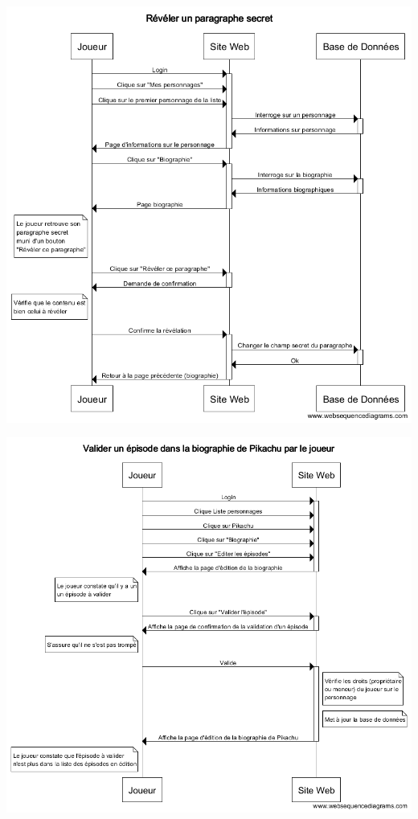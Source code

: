 \documentclass[a4paper, 11pt, titlepage]{article}
\begin{document}
\begin{center}
\includegraphics[scale=0.55]{sequence/RevelerParagraphe.png}
\end{center}

\begin{center}
\includegraphics[scale=0.55]{sequence/ValiderEpisodeParJoueur.png}
\end{center}
\end{document}
